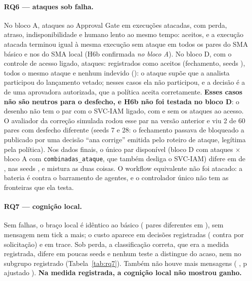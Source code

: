 \documentclass[10pt,a4paper]{article}
\newcommand{\code}[1]{\texttt{#1}}
\begin{document}
\paragraph{RQ6 --- ataques sob falha.}\label{sec:rq6} No bloco A,  ataques ao Approval Gate em
 execuções atacadas, com perda, atraso, indisponibilidade e humano lento ao mesmo tempo:
 aceitos, e a execução atacada terminou igual à mesma execução sem ataque em todos os
 pares do SMA básico e nos  do SMA local (H6b confirmada \emph{no bloco
A}). No bloco D, com o controle de acesso ligado,  ataques: 
registrados como aceitos (fechamento, seeds ), todos o mesmo ataque e nenhum indevido
(): o ataque supõe que a analista participou do lançamento vetado; nesses casos ela não
participou, e a decisão é a de uma aprovadora autorizada, que a política aceita corretamente. \textbf{Esses casos não
são neutros para o desfecho, e H6b não foi testada no bloco D}: o desenho não tem o par com o SVC-IAM ligado, com e sem
os ataques ao acesso. O avaliador da correção simulada rodou esse par na versão anterior e viu 2 de 60 pares com
desfecho diferente (seeds 7 e 28: o fechamento passava de bloqueado a publicado por uma decisão \enquote{ana corrige}
emitida pelo roteiro de ataque, legítima pela política). Nos dados finais, o único par disponível (bloco D com ataques
$\times$ bloco A com \code{combinadas\_ataque}, que também desliga o SVC-IAM) difere em  de
, nas seeds , e mistura as duas coisas. O workflow equivalente não foi atacado: a bateria é contra o barramento de
agentes, e o controlador único não tem as fronteiras que ela testa.

\paragraph{RQ7 --- cognição local.}\label{sec:rq7} Sem falhas, o braço local é idêntico ao básico
( pares diferentes em ), sem mensagem nem tick a mais; o custo aparece em decisões
registradas ( contra  por solicitação) e em trace. Sob
perda, a classificação correta, que era a medida registrada, difere em poucas seeds e nenhum teste a distingue do acaso,
nem no subgrupo registrado (Tabela~\ref{tab:rq7}). Também não houve mais mensagens ( ,
p ajustado ). \textbf{Na medida registrada, a cognição local não mostrou ganho.}
\end{document}

